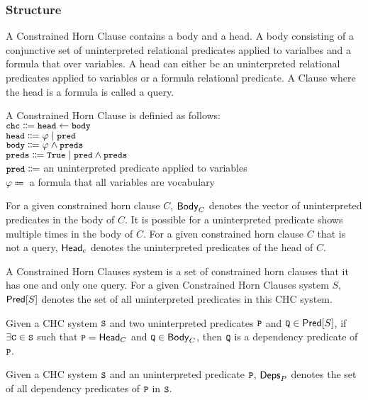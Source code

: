 \subsubsection{Structure}
A Constrained Horn Clause contains a body and a head.
%
A body consisting of a conjunctive set of uninterpreted relational predicates applied to varialbes and a formula
that over variables.
%
A head can either be an uninterpreted relational predicates applied to variables or a formula 
relational predicate.
%
A Clause where the head is a formula is called a query.
\begin{defn}
  A Constrained Horn Clause is definied as follows: \\
  $\cc{chc} \Coloneqq \cc{head} \gets \cc{body}$ \\
  $\cc{head} \Coloneqq \varphi \mid \cc{pred}$  \\
  $\cc{body} \Coloneqq \varphi \wedge \cc{preds}$ \\
  $\cc{preds} \Coloneqq \cc{True} \mid \cc{pred} \wedge \cc{preds}$ \\
  $\cc{pred} \Coloneqq$ an uninterpreted predicate applied to variables \\
  $\varphi \Coloneqq$ a formula that all variables are vocabulary \\
\end{defn}
%
For a given constrained horn clause $C$, $\mathsf{Body}_{C}$ denotes
the vector of uninterpreted predicates in the body of $C$.
%
It is possible for a uninterpreted predicate shows multiple times in the
body of $C$.
%
For a given constrained horn clause $C$ that is not a query,
$\mathsf{Head}_{c}$ denotes the uninterpreted predicates of the head of $C$.
%

A Constrained Horn Clauses system is a set of constrained horn clauses 
that it has one and only one query.
%
For a given Constrained Horn Clauses system $S$,$\mathsf{Pred}[ S ]$ denotes 
the set of all uninterpreted predicates in this CHC system.

\begin{defn}
  Given a CHC system $\cc{S}$ and two uninterpreted predicates $\cc{P}$ and
  $\cc{Q} \in \predof{S}$, if $\exists \cc{C} \in \cc{S}$ such that $\cc{P} = \headof{C}$
  and $\cc{Q} \in \bodyof{C}$, then $\cc{Q}$ is a dependency predicate of $\cc{P}$.
\end{defn}
%
Given a CHC system $\cc{S}$ and an uninterpreted predicate $\cc{P}$, $\mathsf{Deps}_{P}$
denotes the set of all dependency predicates of $\cc{P}$ in $\cc{S}$.
%

